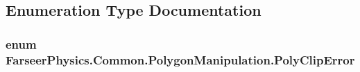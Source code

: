 \subsection{Enumeration Type Documentation}
\hypertarget{namespace_farseer_physics_1_1_common_1_1_polygon_manipulation_a1b9a3408cd322ec7e46098324793b5d5}{
\subsubsection[{Poly\+Clip\+Error}]{\setlength{\rightskip}{0pt plus 5cm}enum {\bf Farseer\+Physics.\+Common.\+Polygon\+Manipulation.\+Poly\+Clip\+Error}}}\label{namespace_farseer_physics_1_1_common_1_1_polygon_manipulation_a1b9a3408cd322ec7e46098324793b5d5}
